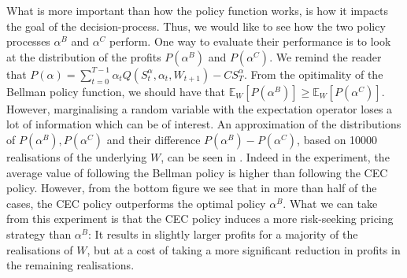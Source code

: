 \documentclass[main.tex]{subfiles}
\begin{document}
What is more important than how the policy function works, is how it
impacts the goal of the decision-process. Thus, we would like to see
how the two policy processes $\alpha^B$ and $\alpha^C$ perform.
One way to evaluate their performance is to look at
the distribution of the profits $P(\alpha^B)$ and $P(\alpha^C)$.
We remind the reader that
$P(\alpha) =
\sum_{t=0}^{T-1}\alpha_tQ(S_t^\alpha,\alpha_t,W_{t+1})-CS_T^\alpha$.
From the opitimality of the Bellman policy function, we should have
that $\mathbb E_W[P(\alpha^B)]\geq \mathbb E_W[P(\alpha^C)]$.
However, marginalising a random variable with the expectation operator
loses a lot of information which can be of interest.
An approximation of the distributions of $P(\alpha^B), P(\alpha^C)$
and their difference
$P(\alpha^B)-P(\alpha^C)$, based on \num{10000} realisations of the
underlying $W$, can be seen in .
Indeed in the experiment, the average value of following the
Bellman policy is higher than following the CEC policy.
However, from the bottom figure we see that
in more than half of the cases, the CEC policy outperforms the optimal
policy $\alpha^B$. What we can take from this experiment is that
the CEC policy induces a more risk-seeking pricing strategy than
$\alpha^B$: It results in slightly larger profits for a majority of the
realisations of $W$, but at a cost of taking a more significant
reduction in
profits in the remaining realisations.
\end{document}
